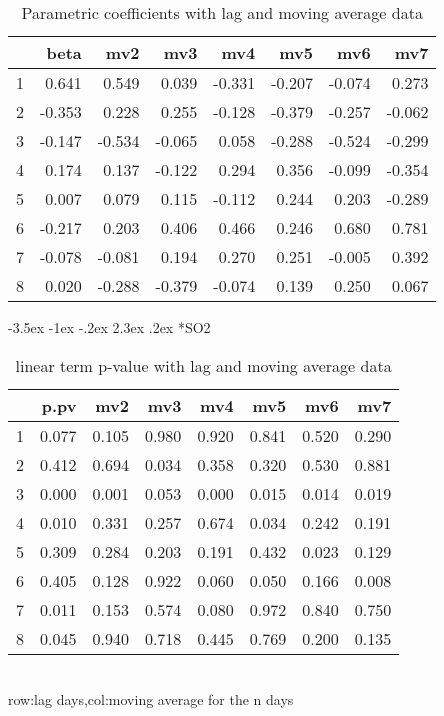 \documentclass[a4paper, 12pt]{article}
\makeatletter
\def\large{\fontsize{14}{20}\selectfont}
\renewcommand\subsection{\@startsection {subsection}{1}{\z@}%
                                   {-3.5ex \@plus -1ex \@minus -.2ex}%
                                   {2.3ex \@plus.2ex}%
                                   {\centering\normalfont\large\bfseries}}
\makeatother
\begin{document}
\begin{table}[h]
\centering
\caption{Parametric coefficients with lag and moving average data}
\begin{tabular}{rrrrrrrr}
  \hline
 & beta & mv2 & mv3 & mv4 & mv5 & mv6 & mv7 \\
  \hline
1 & 0.641 & 0.549 & 0.039 & -0.331 & -0.207 & -0.074 & 0.273 \\
  2 & -0.353 & 0.228 & 0.255 & -0.128 & -0.379 & -0.257 & -0.062 \\
  3 & -0.147 & -0.534 & -0.065 & 0.058 & -0.288 & -0.524 & -0.299 \\
  4 & 0.174 & 0.137 & -0.122 & 0.294 & 0.356 & -0.099 & -0.354 \\
  5 & 0.007 & 0.079 & 0.115 & -0.112 & 0.244 & 0.203 & -0.289 \\
  6 & -0.217 & 0.203 & 0.406 & 0.466 & 0.246 & 0.680 & 0.781 \\
  7 & -0.078 & -0.081 & 0.194 & 0.270 & 0.251 & -0.005 & 0.392 \\
  8 & 0.020 & -0.288 & -0.379 & -0.074 & 0.139 & 0.250 & 0.067 \\
   \hline
\end{tabular}
\end{table}
\clearpage
\subsection*{SO2}
\begin{table}[h]
\centering
\caption{linear term p-value with lag and moving average data}
\begin{tabular}{rrrrrrrr}
  \hline
 & p.pv & mv2 & mv3 & mv4 & mv5 & mv6 & mv7 \\
  \hline
1 & 0.077 & 0.105 & 0.980 & 0.920 & 0.841 & 0.520 & 0.290 \\
  2 & 0.412 & 0.694 & 0.034 & 0.358 & 0.320 & 0.530 & 0.881 \\
  3 & 0.000 & 0.001 & 0.053 & 0.000 & 0.015 & 0.014 & 0.019 \\
  4 & 0.010 & 0.331 & 0.257 & 0.674 & 0.034 & 0.242 & 0.191 \\
  5 & 0.309 & 0.284 & 0.203 & 0.191 & 0.432 & 0.023 & 0.129 \\
  6 & 0.405 & 0.128 & 0.922 & 0.060 & 0.050 & 0.166 & 0.008 \\
  7 & 0.011 & 0.153 & 0.574 & 0.080 & 0.972 & 0.840 & 0.750 \\
  8 & 0.045 & 0.940 & 0.718 & 0.445 & 0.769 & 0.200 & 0.135 \\
   \hline
\end{tabular}
\\row:lag days,col:moving average for the n days
\end{table}
\end{document}
